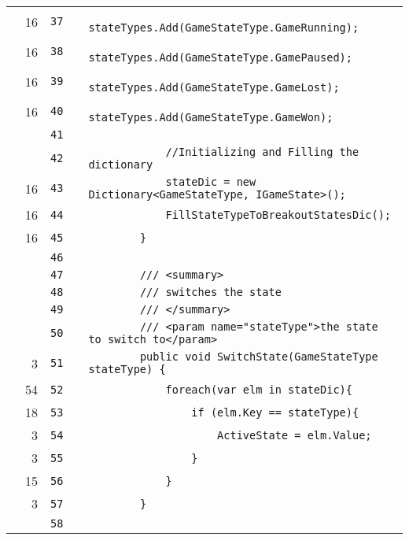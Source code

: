 \documentclass[a4paper,landscape,10pt]{article}
\begin{document}
\begin{longtable}[l]{lrrll}
\cellcolor{green} & 16 & \verb~37~ & & \verb~            stateTypes.Add(GameStateType.GameRunning);~\\
\cellcolor{green} & 16 & \verb~38~ & & \verb~            stateTypes.Add(GameStateType.GamePaused);~\\
\cellcolor{green} & 16 & \verb~39~ & & \verb~            stateTypes.Add(GameStateType.GameLost);~\\
\cellcolor{green} & 16 & \verb~40~ & & \verb~            stateTypes.Add(GameStateType.GameWon);~\\
\cellcolor{gray} &  & \verb~41~ & & \verb~~\\
\cellcolor{gray} &  & \verb~42~ & & \verb~            //Initializing and Filling the dictionary~\\
\cellcolor{green} & 16 & \verb~43~ & & \verb~            stateDic = new Dictionary<GameStateType, IGameState>();~\\
\cellcolor{green} & 16 & \verb~44~ & & \verb~            FillStateTypeToBreakoutStatesDic();~\\
\cellcolor{green} & 16 & \verb~45~ & & \verb~        }~\\
\cellcolor{gray} &  & \verb~46~ & & \verb~~\\
\cellcolor{gray} &  & \verb~47~ & & \verb~        /// <summary>~\\
\cellcolor{gray} &  & \verb~48~ & & \verb~        /// switches the state~\\
\cellcolor{gray} &  & \verb~49~ & & \verb~        /// </summary>~\\
\cellcolor{gray} &  & \verb~50~ & & \verb~        /// <param name="stateType">the state to switch to</param>~\\
\cellcolor{green} & 3 & \verb~51~ & & \verb~        public void SwitchState(GameStateType stateType) {~\\
\cellcolor{green} & 54 & \verb~52~ & & \verb~            foreach(var elm in stateDic){~\\
\cellcolor{green} & 18 & \verb~53~ & & \verb~                if (elm.Key == stateType){~\\
\cellcolor{green} & 3 & \verb~54~ & & \verb~                    ActiveState = elm.Value;~\\
\cellcolor{green} & 3 & \verb~55~ & & \verb~                }~\\
\cellcolor{green} & 15 & \verb~56~ & & \verb~            }~\\
\cellcolor{green} & 3 & \verb~57~ & & \verb~        }~\\
\cellcolor{gray} &  & \verb~58~ & & \verb~~\\

\end{longtable}
\end{document}
